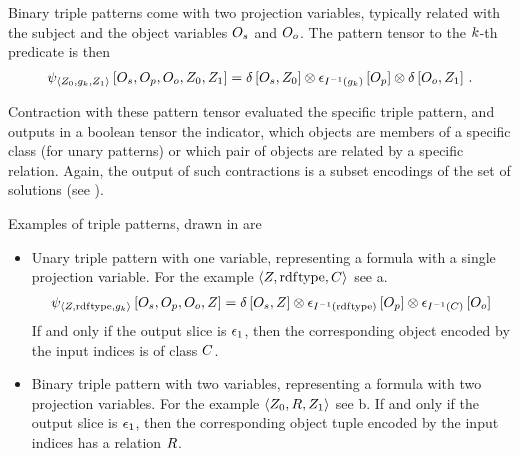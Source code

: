 Binary triple patterns come with two projection variables, typically related with the subject and the object variables $O_{s}$ and $O_{o}$.
The pattern tensor to the $k$-th predicate is then
\begin{align*}
    \psi_{\braket{Z_{0},g_{k},Z_{1}}}\left[
        O_{s}, O_{p}, O_{o}, Z_{0}, Z_{1}
    \right]
    = \delta\left[O_{s},Z_{0}\right]
    \otimes \epsilon_{I^{-1}(g_{k})}\left[O_{p}\right]
    \otimes \delta\left[O_{o},Z_{1}\right] \, .
\end{align*}

Contraction with these pattern tensor evaluated the specific triple pattern, and outputs in a boolean tensor the indicator, which objects are members of a specific class (for unary patterns) or which pair of objects are related by a specific relation.
Again, the output of such contractions is a subset encodings of the set of solutions (see ).


Examples of triple patterns, drawn in  are
\begin{itemize}
    \item Unary triple pattern with one variable, representing a formula with a single projection variable.
    For the example $\braket{Z,\mathrm{rdf}\mathrm{type},C}$ see a.
    \begin{align*}
        \psi_{\braket{Z,\mathrm{rdf}\mathrm{type},g_{k}}}\left[
            O_{s}, O_{p}, O_{o}, Z
        \right]
        = \delta\left[O_{s},Z\right]
        \otimes \epsilon_{I^{-1}(\mathrm{rdf}\mathrm{type})}\left[O_{p}\right]
        \otimes \epsilon_{I^{-1}(C)}\left[O_{o}\right]
    \end{align*}
    If and only if the output slice is $\epsilon_{1}$, then the corresponding object encoded by the input indices is of class $C$.
    \item Binary triple pattern with two variables, representing a formula with two projection variables.
    For the example  $\braket{Z_{0},R,Z_{1}}$ see b.
    If and only if the output slice is $\epsilon_{1}$, then the corresponding object tuple encoded by the input indices has a relation $R$.
\end{itemize}


